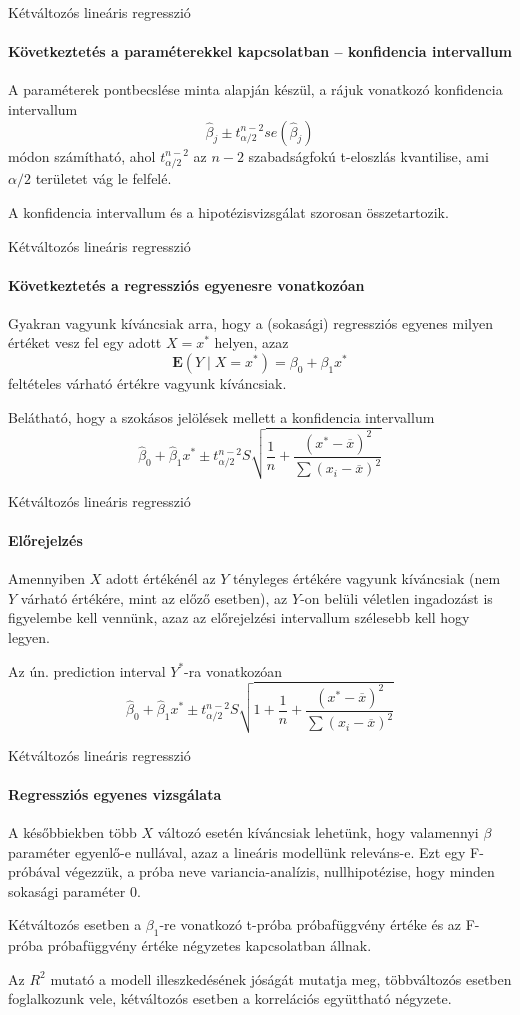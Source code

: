 \documentclass[10pt]{beamer}
\begin{document}
\begin{frame}{Kétváltozós lineáris regresszió}
\framesubtitle{Következtetés a paraméterekkel kapcsolatban -- konfidencia intervallum}
A paraméterek pontbecslése minta alapján készül, a rájuk vonatkozó konfidencia intervallum 
\[
\hat{\beta}_j \pm t_{\alpha/2}^{n-2}se\left(\hat{\beta}_j \right)
\]
módon számítható, ahol $t_{\alpha/2}^{n-2}$ az $n-2$ szabadságfokú t-eloszlás kvantilise, ami $\alpha/2$ területet vág le felfelé.

A konfidencia intervallum és a hipotézisvizsgálat szorosan összetartozik.
\end{frame}

\begin{frame}{Kétváltozós lineáris regresszió}
\framesubtitle{Következtetés a regressziós egyenesre vonatkozóan}
Gyakran vagyunk kíváncsiak arra, hogy a (sokasági) regressziós egyenes milyen értéket vesz fel egy adott $X=x^*$ helyen, azaz
\[
\mathbf{E}\left(Y \mid X = x^* \right) = \beta_0 + \beta_1 x^*
\]
feltételes várható értékre vagyunk kíváncsiak.

Belátható, hogy a szokásos jelölések mellett a konfidencia intervallum
\[
\hat{\beta}_0 + \hat{\beta}_1 x^* \pm t_{\alpha/2}^{n-2}S\sqrt{\dfrac{1}{n}+\dfrac{\left(x^* - \overline{x}\right)^2}{\sum \left(x_i - \overline{x}\right)^2}}
\]
\end{frame}

\begin{frame}{Kétváltozós lineáris regresszió}
\framesubtitle{Előrejelzés}
Amennyiben $X$ adott értékénél az $Y$ tényleges értékére vagyunk kíváncsiak (nem $Y$ várható értékére, mint az előző esetben), az $Y$-on  belüli véletlen ingadozást is figyelembe kell vennünk, azaz az előrejelzési intervallum szélesebb kell hogy legyen.

Az ún. prediction interval $Y^*$-ra vonatkozóan
\[
\hat{\beta}_0 + \hat{\beta}_1 x^* \pm t_{\alpha/2}^{n-2}S\sqrt{1 + \dfrac{1}{n}+\dfrac{\left(x^* - \overline{x}\right)^2}{\sum \left(x_i - \overline{x}\right)^2}}
\]
\end{frame}

\begin{frame}{Kétváltozós lineáris regresszió}
\framesubtitle{Regressziós egyenes vizsgálata}
A későbbiekben több $X$ változó esetén kíváncsiak lehetünk, hogy valamennyi $\beta$ paraméter egyenlő-e nullával, azaz a lineáris modellünk releváns-e.
Ezt egy F-próbával végezzük, a próba neve variancia-analízis,  nullhipotézise, hogy minden sokasági paraméter 0.

Kétváltozós esetben a $\beta_1$-re vonatkozó t-próba próbafüggvény értéke és az F-próba próbafüggvény értéke négyzetes kapcsolatban állnak.

Az $R^2$ mutató a modell illeszkedésének jóságát mutatja meg, többváltozós esetben foglalkozunk vele, kétváltozós esetben a korrelációs együttható négyzete.
\end{frame}
\end{document}
